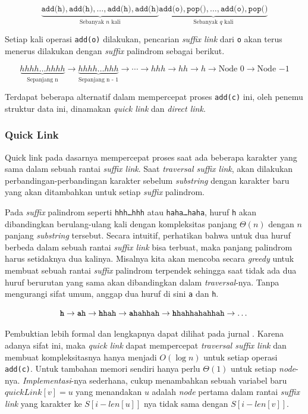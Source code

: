 \documentclass[11pt, a4paper, final]{article}
\begin{document}
\[\underbrace{\texttt{add(h)},\texttt{add(h)}, \dots, \texttt{add(h)},\texttt{add(h)}}_\text{Sebanyak $n$ kali}\underbrace{\texttt{add(o)},\texttt{pop()}, \dots, \texttt{add(o)},\texttt{pop()}}_\text{Sebanyak $q$ kali}\]

Setiap kali operasi \texttt{add(o)} dilakukan, pencarian \textit{suffix link} dari \texttt{o} akan terus menerus dilakukan dengan \textit{suffix} palindrom sebagai berikut.

\[\underbrace{hhhh\dots hhhh}_\text{Sepanjang n} \rightarrow \underbrace{hhhh\dots hhh}_\text{Sepanjang n - 1} \rightarrow \cdots \rightarrow hhh \rightarrow hh \rightarrow h \rightarrow \text{Node } 0 \rightarrow \text{Node } {-1}\]

Terdapat beberapa alternatif dalam mempercepat proses \texttt{add(c)} ini, oleh penemu struktur data ini, dinamakan \textit{quick link} dan \textit{direct link}.

\subsubsection{Quick Link}

Quick link pada dasarnya mempercepat proses saat ada beberapa karakter yang sama dalam sebuah rantai \textit{suffix link}. Saat \textit{traversal suffix link}, akan dilakukan perbandingan-perbandingan karakter sebelum \textit{substring} dengan karakter baru yang akan ditambahkan untuk setiap \textit{suffix} palindrom.

Pada \textit{suffix} palindrom seperti \texttt{hhh\dots hhh} atau  \texttt{haha\dots haha}, huruf \texttt{h} akan dibandingkan berulang-ulang kali dengan kompleksitas panjang $\Theta(n)$ dengan $n$ panjang \textit{substring} tersebut. Secara intuitif, perhatikan bahwa untuk dua huruf berbeda dalam sebuah rantai \textit{suffix link} bisa terbuat, maka panjang palindrom harus setidaknya dua kalinya. Misalnya kita akan mencoba secara \textit{greedy} untuk membuat sebuah rantai \textit{suffix} palindrom terpendek sehingga saat tidak ada dua huruf berurutan yang sama akan dibandingkan dalam \textit{traversal}-nya. Tanpa mengurangi sifat umum, anggap dua huruf di sini \texttt{a} dan \texttt{h}.

$$\texttt{\textbf{h}} \rightarrow \texttt{\textbf{a}h} \rightarrow \texttt{\textbf{h}hah} \rightarrow \texttt{\textbf{a}hahhah} \rightarrow \texttt{\textbf{h}hahhahahhah} \rightarrow \dots$$

Pembuktian lebih formal dan lengkapnya dapat dilihat pada jurnal \cite{kosolobov2015mathrmpalk}. Karena adanya sifat ini, maka \textit{quick link} dapat mempercepat \textit{traversal suffix link} dan membuat kompleksitasnya hanya menjadi $O(\log n)$ untuk setiap operasi \texttt{add(c)}. Untuk tambahan memori sendiri hanya perlu $\Theta(1)$ untuk setiap \textit{node}-nya. \textit{Implementasi}-nya sederhana, cukup menambahkan sebuah variabel baru $quickLink[v] = u$ yang menandakan $u$ adalah \textit{node} pertama dalam rantai \textit{suffix link} yang karakter ke $S[i - len[u]]$ nya tidak sama dengan $S[i - len[v]]$.
\end{document}
